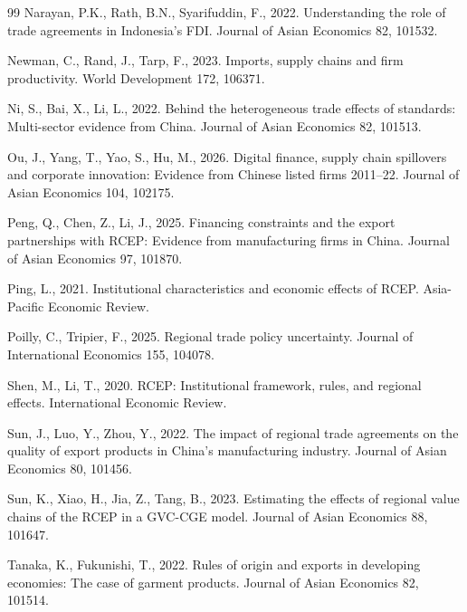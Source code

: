 \documentclass[preprint,12pt,authoryear]{elsarticle}
\begin{document}
\begin{thebibliography}{99}
Narayan, P.K., Rath, B.N., Syarifuddin, F., 2022. Understanding the role of trade agreements in Indonesia's FDI. Journal of Asian Economics 82, 101532.

Newman, C., Rand, J., Tarp, F., 2023. Imports, supply chains and firm productivity. World Development 172, 106371.

Ni, S., Bai, X., Li, L., 2022. Behind the heterogeneous trade effects of standards: Multi-sector evidence from China. Journal of Asian Economics 82, 101513.

Ou, J., Yang, T., Yao, S., Hu, M., 2026. Digital finance, supply chain spillovers and corporate innovation: Evidence from Chinese listed firms 2011--22. Journal of Asian Economics 104, 102175.

Peng, Q., Chen, Z., Li, J., 2025. Financing constraints and the export partnerships with RCEP: Evidence from manufacturing firms in China. Journal of Asian Economics 97, 101870.

Ping, L., 2021. Institutional characteristics and economic effects of RCEP. Asia-Pacific Economic Review.

Poilly, C., Tripier, F., 2025. Regional trade policy uncertainty. Journal of International Economics 155, 104078.

Shen, M., Li, T., 2020. RCEP: Institutional framework, rules, and regional effects. International Economic Review.

Sun, J., Luo, Y., Zhou, Y., 2022. The impact of regional trade agreements on the quality of export products in China's manufacturing industry. Journal of Asian Economics 80, 101456.

Sun, K., Xiao, H., Jia, Z., Tang, B., 2023. Estimating the effects of regional value chains of the RCEP in a GVC-CGE model. Journal of Asian Economics 88, 101647.

Tanaka, K., Fukunishi, T., 2022. Rules of origin and exports in developing economies: The case of garment products. Journal of Asian Economics 82, 101514.


\end{thebibliography}
\end{document}
